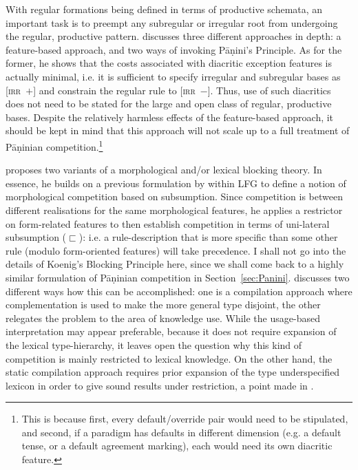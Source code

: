 \documentclass[output=paper
                ,modfonts
                ,nonflat
	        ,collection
	        ,collectionchapter
	        ,collectiontoclongg
 	        ,biblatex
                ,babelshorthands
                ,newtxmath
                ,draftmode
                ,colorlinks, citecolor=brown
]{./langsci/langscibook}
\begin{document}
{With regular formations being defined in terms of productive schemata,
an important task is to preempt any subregular or irregular root from
undergoing the regular, productive pattern. \citet{Koenig99} discusses
three different approaches in depth: a feature-based approach, and two
ways of invoking Pāṇini's Principle. As for the former, he shows that
the costs associated with diacritic exception features is actually
minimal, i.e. it is sufficient to specify irregular and subregular
bases as \textsc{[irr~$+$]} and constrain the regular rule to
\textsc{[irr~$-$]}. Thus, use of such diacritics does not need to be
stated for the large and open class of regular, productive
bases. Despite the relatively harmless effects of the feature-based
approach, it should be kept in mind that this approach will not scale
up to a full treatment of Pāṇinian competition.\footnote{This is
  because first, every default/override pair would need to be
  stipulated, and second, if a paradigm has defaults in different
  dimension (e.g. a default tense, or a default agreement marking),
  each would need its own diacritic feature.}

\citet{Koenig99} proposes two variants of a morphological and/or lexical blocking
theory. In essence, he builds on a previous formulation by
\citet{Andrews90} within LFG to define a notion of morphological
competition based on subsumption. Since competition is between
different realisations for the same morphological features, he applies
a restrictor on form-related features to then establish competition in
terms of uni-lateral subsumption ($\sqsubset$): i.e. a
rule-description that is more specific than some other rule (modulo
form-oriented features) will take precedence. I shall not go into the
details of Koenig's Blocking Principle here, since we shall come back
to a highly similar formulation of Pāṇinian competition in
Section~\ref{sec:Panini}.  \citet{Koenig99} discusses two different
ways how this can be accomplished: one is a compilation approach where
complementation is used to make the more general type disjoint, the
other relegates the problem to the area of knowledge use. While the
usage-based interpretation may appear preferable, because it does not
require expansion of the lexical type-hierarchy, it leaves open the
question why this kind of competition is mainly restricted to lexical
knowledge. On the other hand, the static compilation approach requires
prior expansion of the type underspecified lexicon in order to give
sound results under restriction, a point made in
\citet{crysmann_b03book}.

}
\end{document}
